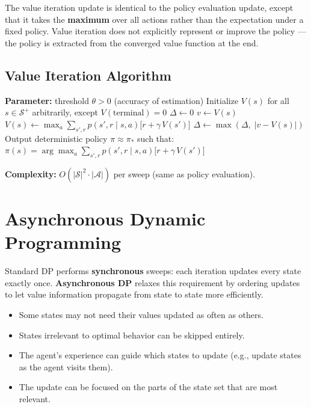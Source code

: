 \documentclass[11pt,a4paper]{article}
\theoremstyle{definition}
\theoremstyle{plain}
\theoremstyle{remark}
\begin{document}
\begin{tcolorbox}[colback=green!5!white, colframe=green!60!black, title={Value Iteration vs Policy Evaluation}]
The value iteration update is identical to the policy evaluation update, except that it takes the \textbf{maximum} over all actions rather than the expectation under a fixed policy. Value iteration does not explicitly represent or improve the policy --- the policy is extracted from the converged value function at the end.
\end{tcolorbox}

\subsection{Value Iteration Algorithm}

\begin{algorithm}
\caption{Value Iteration, estimating $\pi \approx \pi_*$}
\begin{algorithmic}
\STATE \textbf{Parameter:} threshold $\theta > 0$ (accuracy of estimation)
\STATE Initialize $V(s)$ for all $s \in \mathcal{S}^+$ arbitrarily, except $V(\text{terminal}) = 0$
\REPEAT
    \STATE $\Delta \leftarrow 0$
        \STATE $v \leftarrow V(s)$
        \STATE $V(s) \leftarrow \max_a \sum_{s', r} p(s', r \mid s, a)\bigl[r + \gamma\, V(s')\bigr]$
        \STATE $\Delta \leftarrow \max(\Delta,\; |v - V(s)|)$
    \ENDFOR
\UNTIL{$\Delta < \theta$}
\STATE
\STATE Output deterministic policy $\pi \approx \pi_*$ such that:
\STATE $\pi(s) = \arg\max_a \sum_{s', r} p(s', r \mid s, a)\bigl[r + \gamma\, V(s')\bigr]$
\end{algorithmic}
\end{algorithm}

\textbf{Complexity:} $O(|\mathcal{S}|^2 \cdot |\mathcal{A}|)$ per sweep (same as policy evaluation).

\section{Asynchronous Dynamic Programming}

Standard DP performs \textbf{synchronous} sweeps: each iteration updates every state exactly once. \textbf{Asynchronous DP} relaxes this requirement by ordering updates to let value information propagate from state to state more efficiently.

\begin{itemize}
    \item Some states may not need their values updated as often as others.
    \item States irrelevant to optimal behavior can be skipped entirely.
    \item The agent's experience can guide which states to update (e.g., update states as the agent visits them).
    \item The update can be focused on the parts of the state set that are most relevant.
\end{itemize}
\end{document}
